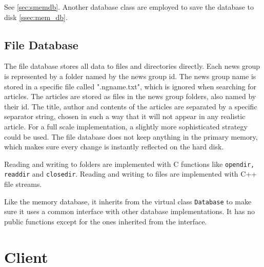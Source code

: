\documentclass{acmsiggraph}               %
\begin{document}
See \ref{sec:smemdb}. Another database class are employed to save the
database to disk \ref{ssec:mem_db}.

\subsection{File Database}
\label{ssec:file_db}
The file database stores all data to files and directories directly. Each news group is represented
by a folder named by the news group id. The news group name is stored in a specific file called ".ngname.txt",
which is ignored when searching for articles. The articles are stored as files in the news group folders, 
also named by their id. The title, author and contents of the articles are separated by a specific separator
string, chosen in such a way that it will not appear in any realistic article. For a full scale implementation, a
slightly more sophisticated strategy could be used. The file database does not keep anything in the primary memory, 
which makes sure every change is instantly reflected on the hard disk. 

Reading and writing to folders are implemented with C functions like \texttt{opendir, readdir} and \texttt{closedir}.
Reading and writing to files are implemented with C++ file streams. 

Like the memory database, it inherits from the virtual class \texttt{Database} to make sure it uses a common 
interface with other database implementations. It has no public functions except for the ones inherited
from the interface.


\section{Client}
\label{sec:client}
\end{document}
